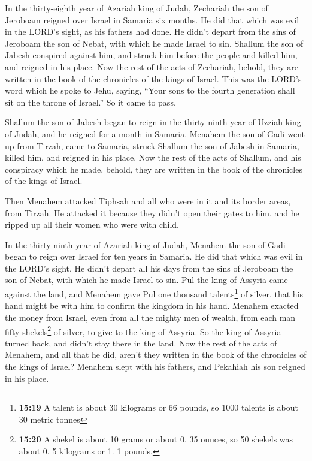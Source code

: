  In the thirty-eighth year of Azariah king of Judah,
Zechariah the son of Jeroboam reigned over Israel in Samaria six months.
 He did that which was evil in the LORD's sight, as his
fathers had done. He didn't depart from the sins of Jeroboam the son of
Nebat, with which he made Israel to sin.  Shallum the son
of Jabesh conspired against him, and struck him before the people and
killed him, and reigned in his place.  Now the rest of
the acts of Zechariah, behold, they are written in the book of the
chronicles of the kings of Israel.  This was the LORD's
word which he spoke to Jehu, saying, ``Your sons to the fourth
generation shall sit on the throne of Israel.'' So it came to pass.

 Shallum the son of Jabesh began to reign in the
thirty-ninth year of Uzziah king of Judah, and he reigned for a month in
Samaria.  Menahem the son of Gadi went up from Tirzah,
came to Samaria, struck Shallum the son of Jabesh in Samaria, killed
him, and reigned in his place.  Now the rest of the acts
of Shallum, and his conspiracy which he made, behold, they are written
in the book of the chronicles of the kings of Israel.

 Then Menahem attacked Tiphsah and all who were in it and
its border areas, from Tirzah. He attacked it because they didn't open
their gates to him, and he ripped up all their women who were with
child.

 In the thirty ninth year of Azariah king of Judah,
Menahem the son of Gadi began to reign over Israel for ten years in
Samaria.  He did that which was evil in the LORD's sight.
He didn't depart all his days from the sins of Jeroboam the son of
Nebat, with which he made Israel to sin.  Pul the king of
Assyria came against the land, and Menahem gave Pul one thousand
talents\footnote{\textbf{15:19} A talent is about 30 kilograms or 66
  pounds, so 1000 talents is about 30 metric tonnes} of silver, that his
hand might be with him to confirm the kingdom in his hand.
 Menahem exacted the money from Israel, even from all the
mighty men of wealth, from each man fifty shekels\footnote{\textbf{15:20}
  A shekel is about 10 grams or about 0. 35 ounces, so 50 shekels was
  about 0. 5 kilograms or 1. 1 pounds.} of silver, to give to the king
of Assyria. So the king of Assyria turned back, and didn't stay there in
the land.  Now the rest of the acts of Menahem, and all
that he did, aren't they written in the book of the chronicles of the
kings of Israel?  Menahem slept with his fathers, and
Pekahiah his son reigned in his place.

